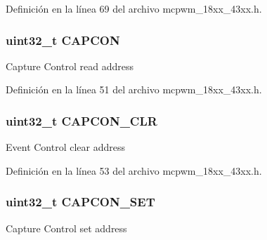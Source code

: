 Definición en la línea 69 del archivo mcpwm\+\_\+18xx\+\_\+43xx.\+h.

\subsubsection[{\texorpdfstring{C\+A\+P\+C\+ON}{CAPCON}}]{ uint32\+\_\+t C\+A\+P\+C\+ON}\hypertarget{struct_l_p_c___m_c_p_w_m___t_ae24a85711d08bacdf4d2e074b719022d}{}\label{struct_l_p_c___m_c_p_w_m___t_ae24a85711d08bacdf4d2e074b719022d}
Capture Control read address 

Definición en la línea 51 del archivo mcpwm\+\_\+18xx\+\_\+43xx.\+h.

\subsubsection[{\texorpdfstring{C\+A\+P\+C\+O\+N\+\_\+\+C\+LR}{CAPCON_CLR}}]{ uint32\+\_\+t C\+A\+P\+C\+O\+N\+\_\+\+C\+LR}\hypertarget{struct_l_p_c___m_c_p_w_m___t_a127d7958c6b4c24b136aed46e6c6b718}{}\label{struct_l_p_c___m_c_p_w_m___t_a127d7958c6b4c24b136aed46e6c6b718}
Event Control clear address 

Definición en la línea 53 del archivo mcpwm\+\_\+18xx\+\_\+43xx.\+h.

\subsubsection[{\texorpdfstring{C\+A\+P\+C\+O\+N\+\_\+\+S\+ET}{CAPCON_SET}}]{ uint32\+\_\+t C\+A\+P\+C\+O\+N\+\_\+\+S\+ET}\hypertarget{struct_l_p_c___m_c_p_w_m___t_a29fe8cc389580c5ee466e528145e8772}{}\label{struct_l_p_c___m_c_p_w_m___t_a29fe8cc389580c5ee466e528145e8772}
Capture Control set address 

